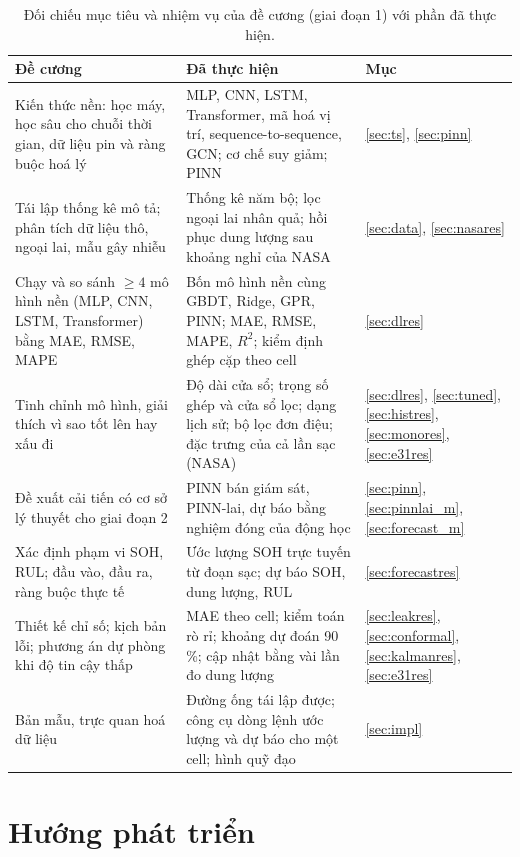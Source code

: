 \documentclass[12pt,a4paper,oneside]{report}
\theoremstyle{plain}
\theoremstyle{definition}
\begin{document}
\begin{table}[!htbp]\centering\footnotesize
\caption{Đối chiếu mục tiêu và nhiệm vụ của đề cương (giai đoạn 1) với phần đã thực hiện.}\label{tab:map}
\begin{tabularx}{\textwidth}{>{\raggedright\arraybackslash}p{4.6cm}X>{\raggedright\arraybackslash}p{1.9cm}}
\toprule
Đề cương & Đã thực hiện & Mục \\
\midrule
Kiến thức nền: học máy, học sâu cho chuỗi thời gian, dữ liệu pin và ràng buộc hoá lý & MLP, CNN, LSTM, Transformer,
mã hoá vị trí, sequence-to-sequence, GCN; cơ chế suy giảm; PINN & \ref{sec:ts}, \ref{sec:pinn} \\
Tái lập thống kê mô tả; phân tích dữ liệu thô, ngoại lai, mẫu gây nhiễu & Thống kê năm bộ; lọc ngoại lai nhân quả;
hồi phục dung lượng sau khoảng nghỉ của NASA & \ref{sec:data}, \ref{sec:nasares} \\
Chạy và so sánh $\ge 4$ mô hình nền (MLP, CNN, LSTM, Transformer) bằng MAE, RMSE, MAPE & Bốn mô hình nền cùng GBDT,
Ridge, GPR, PINN; MAE, RMSE, MAPE, $R^2$; kiểm định ghép cặp theo cell & \ref{sec:dlres} \\
Tinh chỉnh mô hình, giải thích vì sao tốt lên hay xấu đi & Độ dài cửa sổ; trọng số ghép và cửa sổ lọc; dạng lịch sử;
bộ lọc đơn điệu; đặc trưng của cả lần sạc (NASA) & \ref{sec:dlres}, \ref{sec:tuned}, \ref{sec:histres}, \ref{sec:monores}, \ref{sec:e31res} \\
Đề xuất cải tiến có cơ sở lý thuyết cho giai đoạn 2 & PINN bán giám sát, PINN-lai, dự báo bằng nghiệm đóng của động học
& \ref{sec:pinn}, \ref{sec:pinnlai_m}, \ref{sec:forecast_m} \\
Xác định phạm vi SOH, RUL; đầu vào, đầu ra, ràng buộc thực tế & Ước lượng SOH trực tuyến từ đoạn sạc; dự báo SOH,
dung lượng, RUL & \ref{sec:forecastres} \\
Thiết kế chỉ số; kịch bản lỗi; phương án dự phòng khi độ tin cậy thấp & MAE theo cell; kiểm toán rò rỉ; khoảng dự
đoán 90\,\%; cập nhật bằng vài lần đo dung lượng & \ref{sec:leakres}, \ref{sec:conformal}, \ref{sec:kalmanres}, \ref{sec:e31res} \\
Bản mẫu, trực quan hoá dữ liệu & Đường ống tái lập được; công cụ dòng lệnh ước lượng và dự báo cho một cell; hình
quỹ đạo & \ref{sec:impl} \\
\bottomrule
\end{tabularx}
\end{table}

\section{Hướng phát triển}
\end{document}
